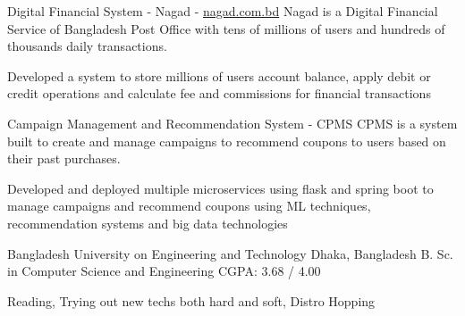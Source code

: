 \documentclass[10pt]{article}
\begin{document}
\headedsectionthree
{Digital Financial System - Nagad - {\href{https://nagad.com.bd/}{nagad.com.bd}}}{}
{Nagad is a Digital Financial Service of Bangladesh Post Office with tens of millions of users and hundreds of thousands daily transactions.}
{\vspace{-2.4ex}
\begin{circlist}	
	\item Developed a system to store millions of users account balance, apply debit or credit operations and calculate fee and commissions for financial transactions
\end{circlist}
\begin{indentsection}
\end{indentsection}
}
\headedsectionthree
{Campaign Management and Recommendation System - CPMS}{}
{CPMS is a system built to create and manage campaigns to recommend coupons to users based on their past purchases.}
{\vspace{-2.4ex}
\begin{circlist}	
	\item Developed and deployed multiple microservices using flask and spring boot to manage campaigns and recommend coupons using ML techniques, recommendation systems and big data technologies
\end{circlist}
\begin{indentsection}
\end{indentsection}
}


\spacedhrule{12.0ex}{0.0ex}


\headedsection
{Bangladesh University on Engineering and Technology}
{Dhaka, Bangladesh}
{B. Sc. in Computer Science and Engineering}
{}
{CGPA: 3.68 / 4.00}


\spacedhrule{0.8ex}{0.0ex}
Reading, Trying out new techs both hard and soft, Distro Hopping
\end{document}
